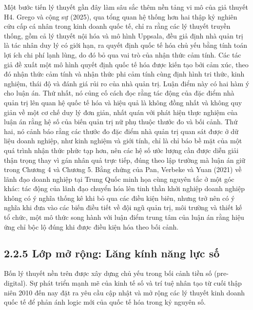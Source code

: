 \documentclass[
  a4paper,
  13pt]{extreport}
\begin{document}
Một bước tiến lý thuyết gần đây làm sâu sắc thêm nền tảng vi mô của giả
thuyết H4. Grego và cộng sự (2025), qua tổng quan hệ thống hơn hai thập
kỷ nghiên cứu cấp cá nhân trong kinh doanh quốc tế, chỉ ra rằng các lý
thuyết truyền thống, gồm cả lý thuyết nội hóa và mô hình Uppsala, đều
giả định nhà quản trị là tác nhân duy lý có giới hạn, ra quyết định quốc
tế hóa chủ yếu bằng tính toán lợi ích chi phí lạnh lùng, do đó bỏ qua
vai trò của nhận thức cảm tính. Các tác giả đề xuất một mô hình quyết
định quốc tế hóa được kiến tạo bởi cảm xúc, theo đó nhận thức cảm tính
và nhận thức phi cảm tính cùng định hình tri thức, kinh nghiệm, thái độ
và đánh giá rủi ro của nhà quản trị. Luận điểm này có hai hàm ý cho luận
án. Thứ nhất, nó củng cố cách đọc rằng tác động của đặc điểm nhà quản
trị lên quan hệ quốc tế hóa và hiệu quả là không đồng nhất và không quy
giản về một cơ chế duy lý đơn giản, nhất quán với phát hiện thực nghiệm
của luận án rằng hệ số của biến quản trị nữ phụ thuộc thước đo và bối
cảnh. Thứ hai, nó cảnh báo rằng các thước đo đặc điểm nhà quản trị quan
sát được ở dữ liệu doanh nghiệp, như kinh nghiệm và giới tính, chỉ là
chỉ báo bề mặt của một quá trình nhận thức phức tạp hơn, nên các hệ số
ước lượng cần được diễn giải thận trọng thay vì gán nhân quả trực tiếp,
đúng theo lập trường mà luận án giữ trong Chương 4 và Chương 5. Bằng
chứng của Pan, Verbeke và Yuan (2021) về lãnh đạo doanh nghiệp tại Trung
Quốc minh họa cùng nguyên tắc ở một góc khác: tác động của lãnh đạo
chuyển hóa lên tinh thần khởi nghiệp doanh nghiệp không có ý nghĩa thống
kê khi bỏ qua các điều kiện biên, nhưng trở nên có ý nghĩa khi đưa vào
các biến điều tiết về đội ngũ quản trị, môi trường và thiết kế tổ chức,
một mô thức song hành với luận điểm trung tâm của luận án rằng hiệu ứng
chỉ bộc lộ đúng khi được điều kiện hóa theo bối cảnh.

\hypertarget{lux1edbp-mux1edf-rux1ed9ng-lux103ng-kuxednh-nux103ng-lux1ef1c-sux1ed1}{%
\subsection{2.2.5 Lớp mở rộng: Lăng kính năng lực
số}\label{lux1edbp-mux1edf-rux1ed9ng-lux103ng-kuxednh-nux103ng-lux1ef1c-sux1ed1}}

Bốn lý thuyết nền trên được xây dựng chủ yếu trong bối cảnh tiền số
(pre-digital). Sự phát triển mạnh mẽ của kinh tế số và trí tuệ nhân tạo
từ cuối thập niên 2010 đến nay đặt ra yêu cầu cập nhật và mở rộng các lý
thuyết kinh doanh quốc tế để phản ánh logic mới của quốc tế hóa trong kỷ
nguyên số.
\end{document}
